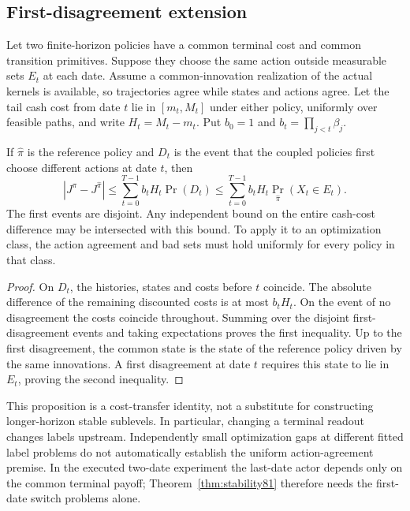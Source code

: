 \subsection{First-disagreement extension}
Let two finite-horizon policies have a common terminal cost and common transition primitives. Suppose they choose the same action outside measurable sets $E_t$ at each date. Assume a common-innovation realization of the actual kernels is available, so trajectories agree while states and actions agree. Let the tail cash cost from date $t$ lie in $[m_t,M_t]$ under either policy, uniformly over feasible paths, and write $H_t=M_t-m_t$. Put $b_0=1$ and $b_t=\prod_{j<t}\beta_j$.

\begin{proposition}\label{prop:first-disagreement81}
If $\widehat\pi$ is the reference policy and $D_t$ is the event that the coupled policies first choose different actions at date $t$, then
\begin{equation}\label{eq:first-disagreement81}
 |J^\pi-J^{\widehat\pi}|
 \le\sum_{t=0}^{T-1}b_tH_t\Pr(D_t)
 \le\sum_{t=0}^{T-1}b_tH_t
                 \Pr_{\widehat\pi}(X_t\in E_t).
\end{equation}
The first events are disjoint. Any independent bound on the entire cash-cost difference may be intersected with this bound. To apply it to an optimization class, the action agreement and bad sets must hold uniformly for every policy in that class.
\end{proposition}

\begin{proof}
On $D_t$, the histories, states and costs before $t$ coincide. The absolute difference of the remaining discounted costs is at most $b_tH_t$. On the event of no disagreement the costs coincide throughout. Summing over the disjoint first-disagreement events and taking expectations proves the first inequality. Up to the first disagreement, the common state is the state of the reference policy driven by the same innovations. A first disagreement at date $t$ requires this state to lie in $E_t$, proving the second inequality.
\end{proof}

This proposition is a cost-transfer identity, not a substitute for constructing longer-horizon stable sublevels. In particular, changing a terminal readout changes labels upstream. Independently small optimization gaps at different fitted label problems do not automatically establish the uniform action-agreement premise. In the executed two-date experiment the last-date actor depends only on the common terminal payoff; Theorem~\ref{thm:stability81} therefore needs the first-date switch problems alone.

